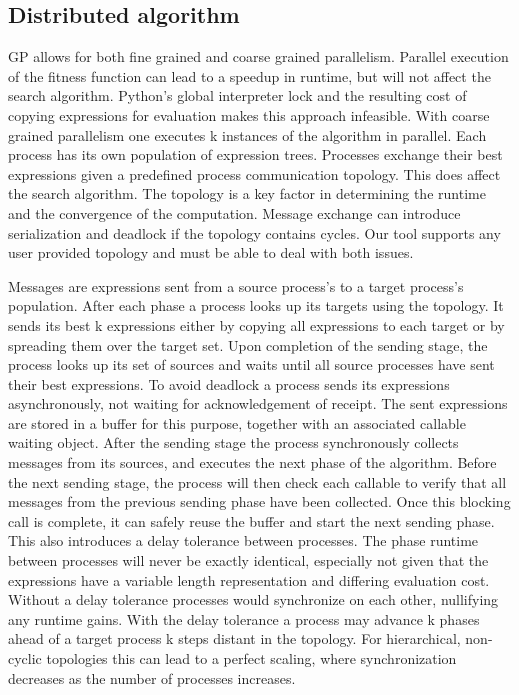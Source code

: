 \subsection{Distributed algorithm}
GP allows for both fine grained and coarse grained parallelism. Parallel execution of the fitness function can lead to a speedup in runtime, but will not affect the search algorithm. Python's global interpreter lock and the resulting cost of copying expressions for evaluation makes this approach infeasible. With coarse grained parallelism one executes k instances of the algorithm in parallel. Each process has its own population of expression trees. Processes exchange their best expressions given a predefined process communication topology. This does affect the search algorithm. The topology is a key factor in determining the runtime and the convergence of the computation. Message exchange can introduce serialization and deadlock if the topology contains cycles. Our tool supports any user provided topology and must be able to deal with both issues. 

Messages are expressions sent from a source process's to a target process's population.
After each phase a process looks up its targets using the topology. It sends its best k expressions either by copying all expressions to each target or by spreading them over the target set. Upon completion of the sending stage, the process looks up its set of sources and waits until all source processes have sent their best expressions. To avoid deadlock a process sends its expressions asynchronously, not waiting for acknowledgement of receipt. The sent expressions are stored in a buffer for this purpose, together with an associated callable waiting object. After the sending stage the process synchronously collects messages from its sources, and executes the next phase of the algorithm. Before the next sending stage, the process will then check each callable to verify that all messages from the previous sending phase have been collected. Once this blocking call is complete, it can safely reuse the buffer and start the next sending phase. This also introduces a delay tolerance between processes. The phase runtime between processes will never be exactly identical, especially not given that the expressions have a variable length representation and differing evaluation cost. Without a delay tolerance processes would synchronize on each other, nullifying any runtime gains. With the delay tolerance a process may advance k phases ahead of a target process k steps distant in the topology. 
For hierarchical, non-cyclic topologies this can lead to a perfect scaling, where synchronization decreases as the number of processes increases.
